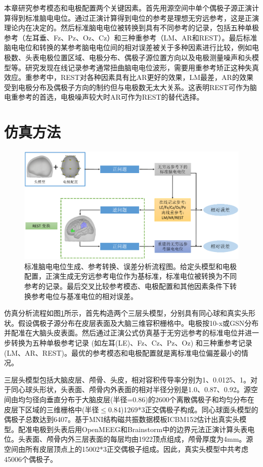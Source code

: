 本章研究参考模态和电极配置两个关键因素。首先用源空间中单个偶极子源正演计算得到标准脑电电位。通过正演计算得到电位的参考是理想无穷远参考，这是正演理论内在决定的。然后标准脑电电位被转换到具有不同参考的记录，包括五种单极参考（左耳垂、Fz、Pz、Oz、Cz）和三种重参考（LM、AR和REST）。最后标准脑电电位和转换的某参考脑电电位间的相对误差被关于多种因素进行比较，例如电极数、头表电极位置区域、电极分布、偶极子源位置方向以及电极测量噪声和头模型等。研究发现在线记录参考通常扭曲脑电电位波形，需要用重参考矫正这种失真效应。重参考中，REST对各种因素具有比AR更好的效果，LM最差，AR的效果受到电极分布及偶极子方向的制约但与电极数无太大关系。这表明REST可作为脑电重参考的首选，电极噪声较大时AR可作为REST的替代选择。

\section{仿真方法}
\begin{figure}[!ht]
	\includegraphics[width=15cm]{pic/JNE/figure1.png}
	\caption{标准脑电电位生成、参考转换、误差分析流程图。给定头模型和电极配置，正演生成无穷远参考电位作为基标准，标准电位被转换为不同
	参考的记录。最后交叉比较参考模态、电极配置和其他因素条件下转换参考电位与基准电位的相对误差。}
	\label{2:pipe}
\end{figure}
仿真分析流程如图\ref{2:pipe}所示，首先构造两个三层头模型，分别具有同心球和真实头形状。假设偶极子源分布在皮层表面及大脑三维容积栅格中。电极按10-x或GSN分布并配准在大脑头皮表面。然后通过正演公式仿真基于无穷远参考的标准电位并进一步转换为五种单极参考记录 (如左耳(LE)、Fz、Cz、Pz、Oz) 和三种重参考记录(LM、AR、REST)。最优的参考模态和电极配置就是离标准电位偏差最小的情况。

三层头模型包括大脑皮层、颅骨、头皮，相对容积传导率分别为1、0.0125、1。对于同心球头形状，头表面、颅骨内外表面的相对半径分别是1.0、0.87、0.92。源空间由均匀径向垂直分布于大脑皮层(半径=0.86)的2600个离散偶极子和均匀分布在皮层下区域的三维栅格中(半径$\leq$0.84)1269*3正交偶极子构成。同心球面头模型的偶极子总数达到6407。基于MNI结构磁共振数据模板ICBM152估计出真实头模型。配准电极到头表后用OpenMEEG和Brainstorm中的边界元法正演计算头表电位。头表面、颅骨内外三层表面的每层均由1922顶点组成，颅骨厚度为4mm。源空间由所有皮层顶点上的15002*3正交偶极子组成。因此，真实头模型中共考虑45006个偶极子。

